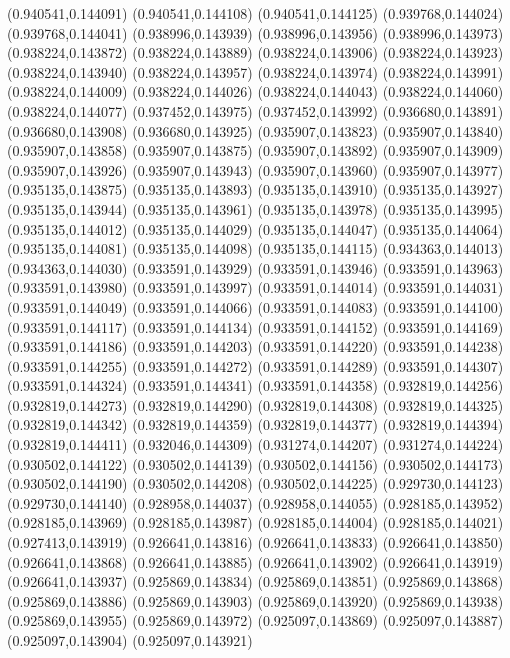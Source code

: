 (0.940541,0.144091)
(0.940541,0.144108)
(0.940541,0.144125)
(0.939768,0.144024)
(0.939768,0.144041)
(0.938996,0.143939)
(0.938996,0.143956)
(0.938996,0.143973)
(0.938224,0.143872)
(0.938224,0.143889)
(0.938224,0.143906)
(0.938224,0.143923)
(0.938224,0.143940)
(0.938224,0.143957)
(0.938224,0.143974)
(0.938224,0.143991)
(0.938224,0.144009)
(0.938224,0.144026)
(0.938224,0.144043)
(0.938224,0.144060)
(0.938224,0.144077)
(0.937452,0.143975)
(0.937452,0.143992)
(0.936680,0.143891)
(0.936680,0.143908)
(0.936680,0.143925)
(0.935907,0.143823)
(0.935907,0.143840)
(0.935907,0.143858)
(0.935907,0.143875)
(0.935907,0.143892)
(0.935907,0.143909)
(0.935907,0.143926)
(0.935907,0.143943)
(0.935907,0.143960)
(0.935907,0.143977)
(0.935135,0.143875)
(0.935135,0.143893)
(0.935135,0.143910)
(0.935135,0.143927)
(0.935135,0.143944)
(0.935135,0.143961)
(0.935135,0.143978)
(0.935135,0.143995)
(0.935135,0.144012)
(0.935135,0.144029)
(0.935135,0.144047)
(0.935135,0.144064)
(0.935135,0.144081)
(0.935135,0.144098)
(0.935135,0.144115)
(0.934363,0.144013)
(0.934363,0.144030)
(0.933591,0.143929)
(0.933591,0.143946)
(0.933591,0.143963)
(0.933591,0.143980)
(0.933591,0.143997)
(0.933591,0.144014)
(0.933591,0.144031)
(0.933591,0.144049)
(0.933591,0.144066)
(0.933591,0.144083)
(0.933591,0.144100)
(0.933591,0.144117)
(0.933591,0.144134)
(0.933591,0.144152)
(0.933591,0.144169)
(0.933591,0.144186)
(0.933591,0.144203)
(0.933591,0.144220)
(0.933591,0.144238)
(0.933591,0.144255)
(0.933591,0.144272)
(0.933591,0.144289)
(0.933591,0.144307)
(0.933591,0.144324)
(0.933591,0.144341)
(0.933591,0.144358)
(0.932819,0.144256)
(0.932819,0.144273)
(0.932819,0.144290)
(0.932819,0.144308)
(0.932819,0.144325)
(0.932819,0.144342)
(0.932819,0.144359)
(0.932819,0.144377)
(0.932819,0.144394)
(0.932819,0.144411)
(0.932046,0.144309)
(0.931274,0.144207)
(0.931274,0.144224)
(0.930502,0.144122)
(0.930502,0.144139)
(0.930502,0.144156)
(0.930502,0.144173)
(0.930502,0.144190)
(0.930502,0.144208)
(0.930502,0.144225)
(0.929730,0.144123)
(0.929730,0.144140)
(0.928958,0.144037)
(0.928958,0.144055)
(0.928185,0.143952)
(0.928185,0.143969)
(0.928185,0.143987)
(0.928185,0.144004)
(0.928185,0.144021)
(0.927413,0.143919)
(0.926641,0.143816)
(0.926641,0.143833)
(0.926641,0.143850)
(0.926641,0.143868)
(0.926641,0.143885)
(0.926641,0.143902)
(0.926641,0.143919)
(0.926641,0.143937)
(0.925869,0.143834)
(0.925869,0.143851)
(0.925869,0.143868)
(0.925869,0.143886)
(0.925869,0.143903)
(0.925869,0.143920)
(0.925869,0.143938)
(0.925869,0.143955)
(0.925869,0.143972)
(0.925097,0.143869)
(0.925097,0.143887)
(0.925097,0.143904)
(0.925097,0.143921)
